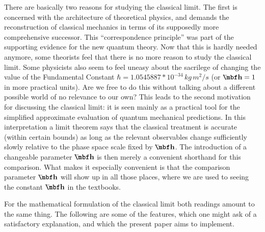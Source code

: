 There are basically two reasons for studying the classical limit.
The first is concerned with the architecture of
theoretical physics, and demands the reconstruction of classical
mechanics in terms of its supposedly more comprehensive successor.
This ``correspondence principle'' was part of the supporting
evidence for the new quantum theory. Now that this is hardly needed
anymore, some theorists feel that there is no more reason to study
the classical limit.  Some physicists also seem to feel uneasy about
the sacrilege of changing the value of the Fundamental Constant
$\hbar=1.0545887*10^{-34}\,kg\,m^2/s$ (or $\hb=1$ in more practical
units). Are we free to do this without talking about a different
possible world of no relevance to our own? This leads to the second
motivation for discussing the classical limit: it is seen mainly as
a practical tool for the simplified approximate evaluation of
quantum mechanical predictions. In this interpretation a limit
theorem says that the classical treatment is accurate (within certain
bounds) as long as the relevant observables change sufficiently
slowly relative to the phase space scale fixed by $\hb$. The
introduction of a changeable parameter $\hb$ is then merely a
convenient shorthand for this comparison. What makes it especially
convenient is that the comparison parameter $\hb$ will show up in
all those places, where we are used to seeing the constant $\hb$ in
the textbooks.

For the mathematical formulation of the classical limit both
readings amount to the same thing. The following are some of the
features, which one might ask of a satisfactory explanation, and
which the present paper aims to implement.

